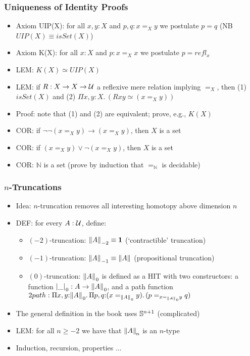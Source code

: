 \documentclass[handout]{beamer}
\newcommand{\depi}[3]{\Pi{#1{:}#2.\,#3}}
\newcommand{\Nat}{\mathbb{N}}
\newcommand{\UU}{{\cal U}}
\newcommand{\bfone}{\mathbf{1}}
\begin{document}
   
         \frame
  {
    \frametitle{Uniqueness of Identity Proofs}
    
\begin{itemize}
    \item Axiom UIP(X): for all $x,y:X$ and $p,q: x =_X y$ we postulate $p=q$ (NB $UIP(X) \equiv isSet(X)$)
    \item Axiom K(X): for all $x:X$ and $p: x =_X x$ we postulate $p=refl_x$
    \item LEM:  $K(X) \simeq UIP(X)$
    \item LEM: if $R:X\to X\to\UU$ a reflexive mere relation implying $=_X$, 
             then (1) $isSet(X)$ and (2) $\depi{x,y}{X}{(Rxy \simeq (x=_X y))}$
    \item Proof: note that (1) and (2) are equivalent; prove, e.g., $K(X)$
    \item COR: if $\neg\neg(x=_X y) \to (x=_X y)$, then $X$ is a set
    \item COR: if $(x=_X y) \lor \neg(x=_X y)$, then $X$ is a set
    \item COR: $\Nat$ is a set (prove by induction that $=_\Nat$ is decidable)
\end{itemize}
  }
  
   \frame
  {
    \frametitle{$n$-Truncations}
    
\begin{itemize}
    \item Idea: $n$-truncation removes all interesting homotopy above dimension $n$
    \item DEF: for every $A:\UU$, define:
      \begin{itemize}[<+->]    
      \item $(-2)$-truncation: ${\brck A}_{-2} \equiv \bfone$  (`contractible' truncation)
      \item $(-1)$-truncation: ${\mathopen{}\left\Vert A\right\Vert_{}\mathclose{}}_{-1} \equiv {\mathopen{}\left\Vert A\right\Vert_{}\mathclose{}}$ (propositional truncation)
      \item $(0)$-truncation: ${\mathopen{}\left\Vert A\right\Vert_{}\mathclose{}}_{0}$ is defined as a HIT with two constructors:       
                a function ${\mathopen{}\left|\_\right|_{}\mathclose{}}_0  :  A \to {\mathopen{}\left\Vert A\right\Vert_{}\mathclose{}}_{0}$, and 
                a path function 
                $2path: \depi{x,y}{{\brck A}_{0}}{\depi{p,q}{(x=_{{\brck A}_{0}} y)}{(p=_{x=_{{\brck A}_{0}} y} q)}}$

       \end{itemize}
    \item The general definition in the book uses $\mathbb{S}^{n+1}$ (complicated)
    \item LEM: for all $n\geq-2$ we have that ${\mathopen{}\left\Vert A\right\Vert_{}\mathclose{}}_{\!n}$ is an $n$-type
    \item Induction, recursion, properties ...
 \end{itemize}
  }
  
\end{document}
